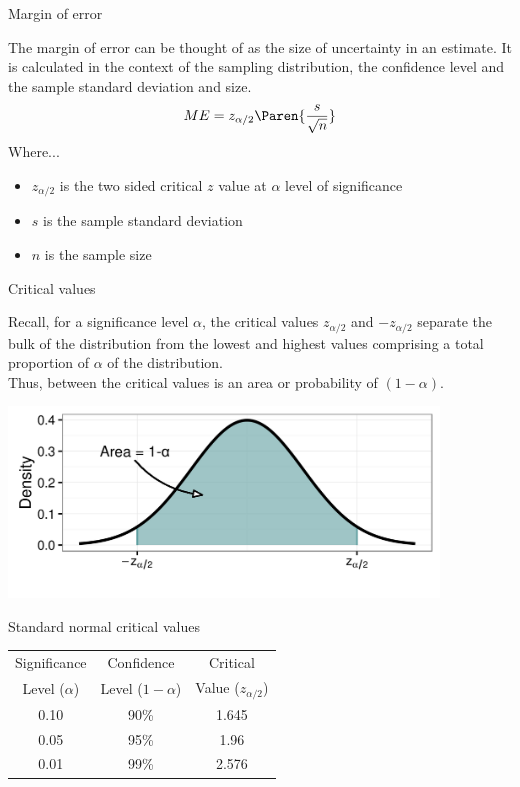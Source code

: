 \documentclass[xcolor=table, aspectratio=169, bigger]{beamer}
\begin{document}
\begin{frame}{Margin of error}
\begin{block}{}
The margin of error can be thought of as the size of uncertainty in an estimate. It is calculated in the context of the sampling distribution, the confidence level and the sample standard deviation and size.
\pause\[ME = z_{\alpha/2} \Paren{\frac s {\sqrt n}}\]
Where...
\begin{itemize}
\item $z_{\alpha/2}$ is the two sided critical $z$ value at $\alpha$ level of significance  
\item $s$ is the sample standard deviation
\item $n$ is the sample size
\end{itemize}
\end{block}
\end{frame}

\begin{frame}{Critical values}
\begin{block}{}
Recall, for a significance level $\alpha$, the critical values $z_{\alpha/2}$ and $-z_{\alpha/2}$ separate the bulk of the distribution from the lowest and highest values comprising a total proportion of $\alpha$ of the distribution.\\
\medskip
Thus, between the critical values is an area or probability of $(1-\alpha)$. 
\end{block}
\medskip
{\centering
\includegraphics[width=4.5in]{../images/ch7_crit_values}
\par}
\end{frame}

\begin{frame}{Standard normal critical values}
\begin{block}{}
{\centering
\begin{tabular}{c | c | c }
Significance & Confidence & Critical \\
Level ($\alpha$) & Level ($1-\alpha$)  & Value ($z_{\alpha/2}$)\\
\hline
0.10 & 90\% &  1.645\\
0.05 & 95\% & 1.96 \\
0.01 & 99\% & 2.576
\end{tabular}
\par}
\end{block}
\end{frame}
\end{document}
